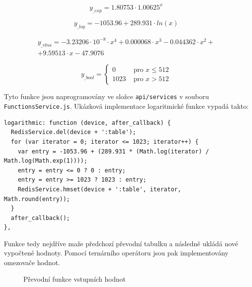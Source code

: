 \begin{equation}
	y_{\_exp} = 1.80753 \cdot 1.00625^x
	\label{eq:exp}
\end{equation}

\begin{equation}
	y_{\_log} = -1053.96 + 289.931 \cdot ln(x)
	\label{eq:log}
\end{equation}

\begin{multline}
	y_{\_vlna} = -3.23206 \cdot 10^{-8} \cdot x^4 + 0.000068 \cdot x^3 - 0.044362 \cdot x^2 + \\
				+9.59513 \cdot x - 47.9076
	\label{eq:vlna}
\end{multline}

\begin{equation}
	y_{\_bool} = \left\{
		\begin{matrix}
			0 & \mbox{ pro }x \leq 512 \\
			1023 & \mbox{ pro }x > 512
		\end{matrix}
	\right.
	\label{eq:bool}
\end{equation}

Tyto funkce jsou naprogramovány ve složce \texttt{api/services} v souboru \texttt{FunctionsService.js}. Ukázková implementace logaritmické funkce vypadá takto:

\begin{verbatim}
logarithmic: function (device, after_callback) {
  RedisService.del(device + ':table');
  for (var iterator = 0; iterator <= 1023; iterator++) {
    var entry = -1053.96 + (289.931 * (Math.log(iterator) / Math.log(Math.exp(1))));
    entry = entry <= 0 ? 0 : entry;
    entry = entry >= 1023 ? 1023 : entry;
    RedisService.hmset(device + ':table', iterator, Math.round(entry));
  }
  after_callback();
},
\end{verbatim}

Funkce tedy nejdříve maže předchozí převodní tabulku a následně ukládá nové vypočtené hodnoty. Pomocí ternárního operátoru \cite{ternar} jsou pak implementovány omezovače hodnot.

\begin{figure}[h]
	\caption{Převodní funkce vstupních hodnot}
\end{figure}

